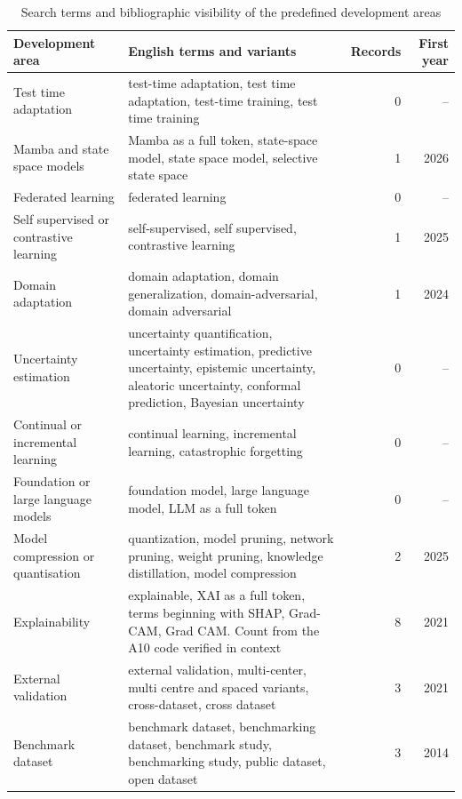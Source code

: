 \begin{table}[!ht]
\caption{Search terms and bibliographic visibility of the predefined development areas}
\centering
\small
\begin{tabularx}{\textwidth}{@{}L{4.0cm}Yrr@{}}
\toprule
Development area & English terms and variants & Records & First year \\
\midrule
Test time adaptation & test-time adaptation, test time adaptation, test-time training, test time training & 0 & -- \\
Mamba and state space models & Mamba as a full token, state-space model, state space model, selective state space & 1 & 2026 \\
Federated learning & federated learning & 0 & -- \\
Self supervised or contrastive learning & self-supervised, self supervised, contrastive learning & 1 & 2025 \\
Domain adaptation & domain adaptation, domain generalization, domain-adversarial, domain adversarial & 1 & 2024 \\
Uncertainty estimation & uncertainty quantification, uncertainty estimation, predictive uncertainty, epistemic uncertainty, aleatoric uncertainty, conformal prediction, Bayesian uncertainty & 0 & -- \\
Continual or incremental learning & continual learning, incremental learning, catastrophic forgetting & 0 & -- \\
Foundation or large language models & foundation model, large language model, LLM as a full token & 0 & -- \\
Model compression or quantisation & quantization, model pruning, network pruning, weight pruning, knowledge distillation, model compression & 2 & 2025 \\
Explainability & explainable, XAI as a full token, terms beginning with SHAP, Grad-CAM, Grad CAM. Count from the A10 code verified in context & 8 & 2021 \\
External validation & external validation, multi-center, multi centre and spaced variants, cross-dataset, cross dataset & 3 & 2021 \\
Benchmark dataset & benchmark dataset, benchmarking dataset, benchmark study, benchmarking study, public dataset, open dataset & 3 & 2014 \\
\bottomrule
\end{tabularx}
\end{table}
